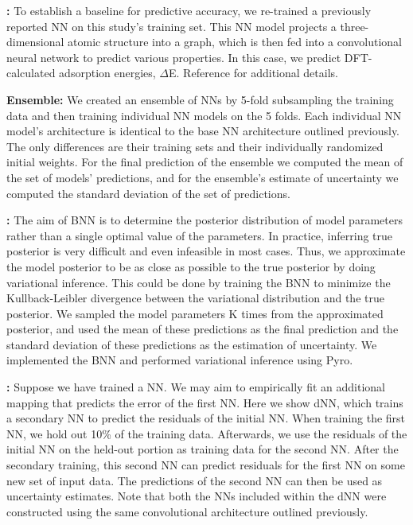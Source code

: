 \documentclass[]{achemso}
\begin{document}
\textbf{:}
To establish a baseline for predictive accuracy, we re-trained a previously reported \gls{NN}\cite{Xie2018, Back2019} on this study's training set.
This \gls{NN} model projects a three-dimensional atomic structure into a graph, which is then fed into a convolutional neural network to predict various properties.
In this case, we predict \gls{DFT}-calculated adsorption energies, $\Delta$E.
Reference \citet{Back2019} for additional details.

\textbf{ Ensemble:}
We created an ensemble of \gls{NN}s by 5-fold subsampling the training data and then training individual \gls{NN} models on the 5 folds.
Each individual \gls{NN} model's architecture is identical to the base \gls{NN} architecture outlined previously.
The only differences are their training sets and their individually randomized initial weights.
For the final prediction of the ensemble we computed the mean of the set of models' predictions, and for the ensemble's estimate of uncertainty we computed the standard deviation of the set of predictions.

\textbf{:}
The aim of \gls{BNN} is to determine the posterior distribution of model parameters rather than a single optimal value of the parameters.
In practice, inferring true posterior is very difficult and even infeasible in most cases.
Thus, we approximate the model posterior to be as close as possible to the true posterior by doing variational inference.
This could be done by training the \gls{BNN} to minimize the Kullback-Leibler divergence between the variational distribution and the true posterior.
We sampled the model parameters K times from the approximated posterior, and used the mean of these predictions as the final prediction and the standard deviation of these predictions as the estimation of uncertainty.
We implemented the \gls{BNN} and performed variational inference using Pyro.\cite{Bingham2018}

\textbf{:}
Suppose we have trained a \gls{NN}.
We may aim to empirically fit an additional mapping that predicts the error of the first \gls{NN}.
Here we show \gls{dNN}, which trains a secondary \gls{NN} to predict the residuals of the initial \gls{NN}.
When training the first \gls{NN}, we hold out 10\% of the training data.
Afterwards, we use the residuals of the initial \gls{NN} on the held-out portion as training data for the second \gls{NN}.
After the secondary training, this second \gls{NN} can predict residuals for the first \gls{NN} on some new set of input data.
The predictions of the second \gls{NN} can then be used as uncertainty estimates.
Note that both the \gls{NN}s included within the \gls{dNN} were constructed using the same convolutional architecture outlined previously.
\end{document}
